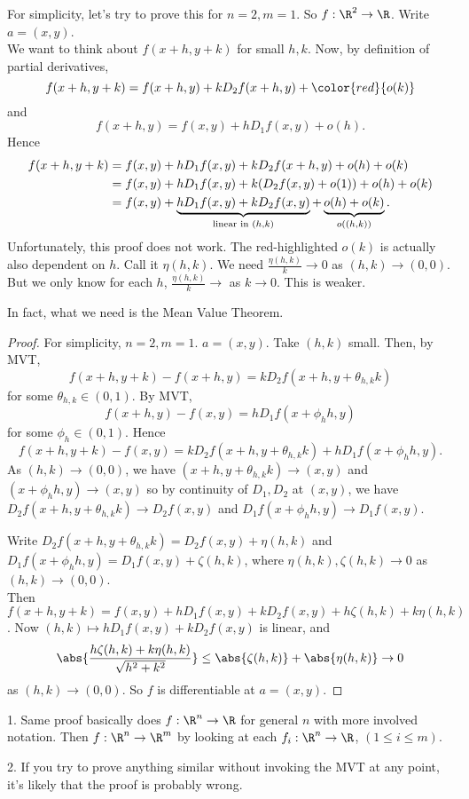 For simplicity, let's try to prove this for $n=2,m=1$. So $f:\R^2\to \R$. Write $a = (x,y)$. \\
We want to think about $f(x+h,y+k)$ for small $h,k$.
Now, by definition of partial derivatives, \[ f(x+h,y+k) = f(x+h,y) + kD_2f(x+h,y) + \color{red}{o(k)} \] and \[ f(x+h,y) = f(x,y) + hD_1f(x,y) + o(h). \] Hence
\begin{align*}
    f(x+h,y+k) &= f(x,y) + hD_1f(x,y) + kD_2f(x+h,y) + o(h) + o(k)\\
    &= f(x,y) + hD_1f(x,y) + k(D_2f(x,y) + o(1)) + o(h) + o(k)\\
    &=f(x,y) + \underbrace{hD_1f(x,y) + kD_2f(x,y)}_{\textup{linear in }(h,k)} + \underbrace{o(h) + o(k)}_{o((h,k))}.
\end{align*}
Unfortunately, this proof does not work. The red-highlighted $o(k)$ is actually also dependent on $h$. Call it $\eta(h,k)$. We need $\frac{\eta(h,k)}{k}\to 0$ as $(h,k) \to (0,0)$. But we only know for each $h$, $\frac{\eta(h,k)}{k}\to$ as $k\to 0$. This is weaker.

In fact, what we need is the Mean Value Theorem.

\begin{proof}
    For simplicity, $n=2,m=1$. $a=(x,y)$. Take $(h,k)$ small.
    Then, by MVT, \[f(x+h,y+k) - f(x+h,y) = kD_2f(x+h, y+\theta_{h,k}k) \] for some $\theta_{h,k}\in (0,1)$.
    By MVT, \[f(x+h,y) - f(x,y) = hD_1f(x+\phi_h h, y) \] for some $\phi_h\in (0,1)$. Hence \[ f(x+h,y+k) - f(x,y) = kD_2f(x+h, y+\theta_{h,k}k) + hD_1f(x+\phi_h h, y) .\]
    As $(h,k)\to (0,0)$, we have $(x+h, y+\theta_{h,k}k)\to(x,y)$ and $(x+\phi_h h, y) \to (x,y)$ so by continuity of $D_1,D_2$ at $(x,y)$, we have $D_2f(x+h, y+\theta_{h,k}k) \to D_2f(x,y)$ and $D_1f(x+\phi_h h, y)\to D_1f(x,y)$.

    Write $D_2f(x+h, y+\theta_{h,k}k) = D_2f(x,y) + \eta(h,k)$ and $D_1f(x+\phi_h h, y) = D_1 f(x,y) + \zeta(h,k)$, where $\eta(h,k), \zeta(h,k)\to 0$ as $(h,k) \to (0,0)$. \\
    Then $f(x+h,y+k) = f(x,y) + hD_1f(x,y) + kD_2f(x,y) + h\zeta(h,k) + k\eta(h,k)$. Now $(h,k)\mapsto hD_1f(x,y) + kD_2f(x,y)$ is linear, and \[ \abs{\frac{h\zeta(h,k) + k\eta(h,k)}{\sqrt{h^2+k^2}}} \leq \abs{\zeta(h,k)} + \abs{\eta(h,k)}\to 0 \] as $(h,k) \to (0,0).$ So $f$ is differentiable at $a= (x,y)$.
\end{proof}

\begin{remark}
    1. Same proof basically does $f:\R^n\to \R$ for general $n$ with more involved notation. Then $f: \R^n\to \R^m$ by looking at each $f_i: \R^n\to \R$, $(1\leq i \leq m)$.

    2. If you try to prove anything similar without invoking the MVT at any point, it's likely that the proof is probably wrong.
\end{remark}

